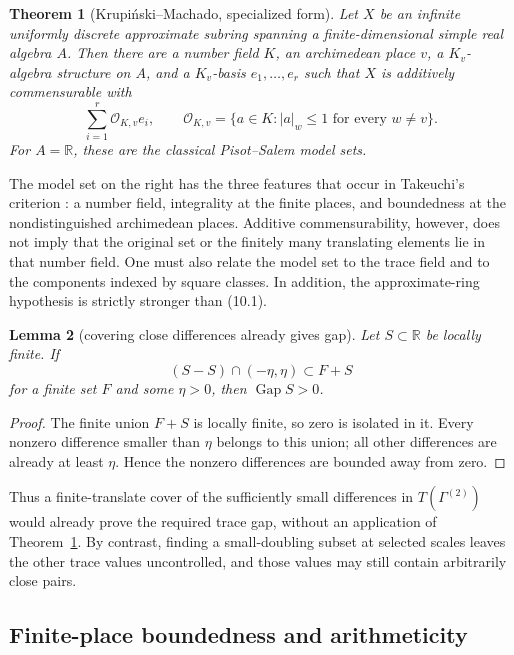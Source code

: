 \documentclass[11pt,reqno]{amsart}
\newtheorem{theorem}{Theorem}[section]
\newtheorem{lemma}[theorem]{Lemma}
\theoremstyle{definition}
\theoremstyle{remark}
\newcommand{\R}{\mathbb R}
\newcommand{\cO}{\mathcal O}
\newcommand{\Gap}{\operatorname{Gap}}
\begin{document}
\begin{theorem}[Krupi\'nski--Machado, specialized form]\label{thm:KM}
Let \(X\) be an infinite uniformly discrete approximate subring spanning a
finite-dimensional simple real algebra \(A\).  Then there are a number field
\(K\), an archimedean place \(v\), a \(K_v\)-algebra structure on \(A\), and a
\(K_v\)-basis \(e_1,\ldots,e_r\) such that \(X\) is additively commensurable
with
\[
 \sum_{i=1}^r\cO_{K,v}e_i,
 \qquad
 \cO_{K,v}=\{a\in K:|a|_w\le1\text{ for every }w\ne v\}.
\tag{11.1}
\]
For \(A=\R\), these are the classical Pisot--Salem model sets.
\end{theorem}

The model set on the right has the three features that occur in Takeuchi's
criterion \cite{Takeuchi}: a number field, integrality at the finite places,
and boundedness at the nondistinguished archimedean places.  Additive
commensurability, however, does not imply that the original set or the
finitely many translating elements lie in that number field.  One must also
relate the model set to the trace field and to the components indexed by
square classes.  In addition, the approximate-ring hypothesis is strictly
stronger than (10.1).

\begin{lemma}[covering close differences already gives gap]\label{lem:additive-cover-gap}
Let \(S\subset\R\) be locally finite.  If
\[
 (S-S)\cap(-\eta,\eta)\subset F+S
\]
for a finite set \(F\) and some \(\eta>0\), then \(\Gap S>0\).
\end{lemma}

\begin{proof}
The finite union \(F+S\) is locally finite, so zero is isolated in it.  Every
nonzero difference smaller than \(\eta\) belongs to this union; all other
differences are already at least \(\eta\).  Hence the nonzero differences are
bounded away from zero.
\end{proof}

Thus a finite-translate cover of the sufficiently small differences in
\(T(\Gamma^{(2)})\) would already prove the required trace gap, without an
application of Theorem~\ref{thm:KM}.  By contrast, finding a
small-doubling subset at selected scales leaves the other trace values
uncontrolled, and those values may still contain arbitrarily close pairs.

\subsection{Finite-place boundedness and arithmeticity}
\end{document}
